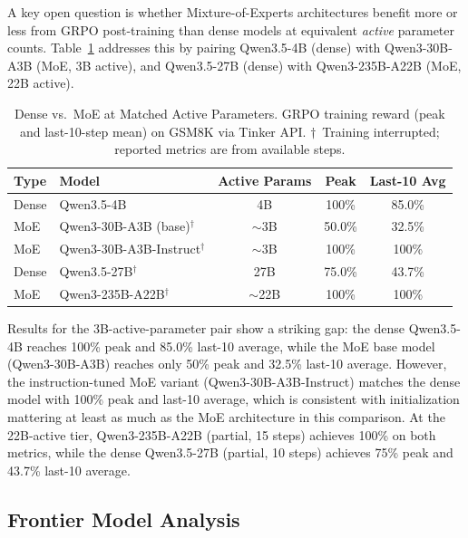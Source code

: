 \documentclass{article}
\begin{document}
A key open question is whether Mixture-of-Experts architectures benefit
more or less from GRPO post-training than dense models at equivalent
\emph{active} parameter counts. Table~\ref{tab:dense_moe} addresses this
by pairing Qwen3.5-4B (dense) with Qwen3-30B-A3B (MoE, 3B active),
and Qwen3.5-27B (dense) with Qwen3-235B-A22B (MoE, 22B active).

\begin{table}[htbp]
\centering
\caption{Dense vs.~MoE at Matched Active Parameters. GRPO training reward (peak and
last-10-step mean) on GSM8K via Tinker API.
$\dagger$~Training interrupted; reported metrics are from available steps.}
\label{tab:dense_moe}
\begin{tabular}{llccc}
\toprule
\textbf{Type} & \textbf{Model} & \textbf{Active Params} & \textbf{Peak} & \textbf{Last-10 Avg} \\
\midrule
Dense & Qwen3.5-4B & 4B & 100\% & 85.0\% \\
MoE & Qwen3-30B-A3B (base)$^\dagger$ & $\sim$3B & 50.0\% & 32.5\% \\
MoE & Qwen3-30B-A3B-Instruct$^\dagger$ & $\sim$3B & 100\% & 100\% \\
\midrule
Dense & Qwen3.5-27B$^\dagger$ & 27B & 75.0\% & 43.7\% \\
MoE & Qwen3-235B-A22B$^\dagger$ & $\sim$22B & 100\% & 100\% \\
\bottomrule
\end{tabular}
\end{table}

Results for the 3B-active-parameter pair show a striking gap: the dense
Qwen3.5-4B reaches 100\% peak and 85.0\% last-10 average, while the
MoE base model (Qwen3-30B-A3B) reaches only 50\% peak and 32.5\% last-10
average. However, the instruction-tuned MoE variant (Qwen3-30B-A3B-Instruct)
matches the dense model with 100\% peak and last-10 average, which is
consistent with initialization mattering at least as much as the MoE
architecture in this comparison. At the 22B-active tier, Qwen3-235B-A22B
(partial, 15 steps) achieves 100\% on both metrics, while the dense
Qwen3.5-27B (partial, 10 steps) achieves 75\% peak and 43.7\% last-10 average.

\subsection{Frontier Model Analysis}
\label{sec:frontier}
\end{document}
